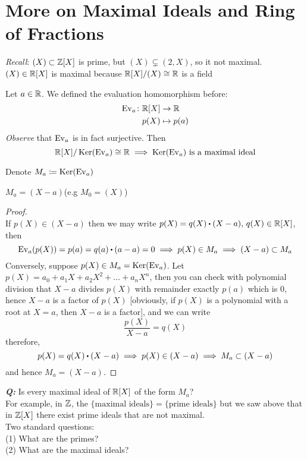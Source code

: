 \documentclass[../Main.tex]{subfiles}
\begin{document}
\chapter{More on Maximal Ideals and Ring of Fractions}

\textit{Recall}: $(X) \subset \mathbb{Z}[X]$ is prime, but $(X)\subsetneq (2,X)$, so it not maximal.\\
$(X)\in \mathbb{R}[X]$ is maximal because $\mathbb{R}[X]/(X) \cong \mathbb{R}$ is a field

\begin{example}
	Let $a\in \mathbb{R}$. We defined the evaluation homomorphism before:
	\begin{align*}
	\operatorname{Ev}_a\colon \mathbb{R}[X] &\to \mathbb{R} \\
	p(X) &\mapsto p(a)
	\end{align*}
	\textit{Observe} that $\operatorname{Ev}_a$ is in fact surjective. Then
	\[\mathbb{R}[X]/\operatorname{Ker}(\operatorname{Ev}_a) \cong \mathbb{R} \implies \operatorname{Ker}(\operatorname{Ev}_a) \text{ is a maximal ideal}\]
\end{example}
	Denote $M_a\coloneqq \operatorname{Ker}(\operatorname{Ev}_a)$
	\begin{claim}
		$M_a = (X-a)$\quad (e.g $M_0 =(X)$)
	\end{claim}
	\begin{proof}~\\
		If $p(X) \in (X-a)$ then we may write $p(X)=q(X)\rdot (X-a),\, q(X)\in \R[X]$, then
		\[\ev_a(p(X)) = p(a) = q(a)\rdot (a-a)=0 \implies p(X)\in M_a \implies (X-a) \subset M_a\] 
		Conversely, suppose $p(X) \in M_a = \operatorname{Ker}(\operatorname{Ev}_a)$. Let $p(X) = a_0 + a_1X+a_2X^2+\dots+a_nX^n$, then you can check with polynomial division that $X-a$ divides $p(X)$ with remainder exactly $p(a)$ which is $0$, hence $X-a$ is a factor of $p(X)$ [obviously, if $p(X)$ is a polynomial with a root at $X=a$, then $X-a$ is a factor], and we can write
		\[\frac{p(X)}{X-a} = q(X)\]
		therefore,
		\[p(X)=q(X)\rdot (X-a)\implies p(X) \in (X-a) \implies M_a \subset (X-a) \]
		and hence $M_a =(X-a)$.
	\end{proof}
\textbf{\textit{Q:}} Is every maximal ideal of $\mathbb{R}[X]$ of the form $M_a$?\\
For example, in $\mathbb{Z}$, the $\{\text{maximal ideals}\} =\{\text{prime ideals}\}$ but we saw above that in $\mathbb{Z}[X]$ there exist prime ideals that are not maximal.\\
Two standard questions:\\
(1) What are the primes?\\
(2) What are the maximal ideals?
\end{document}
